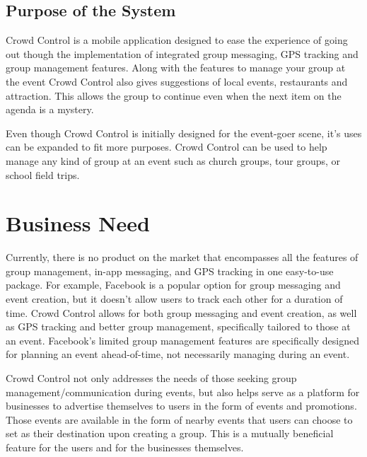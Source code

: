 \subsection{Purpose of the System}
Crowd Control is a mobile application designed to ease the experience of going out though the implementation of integrated group messaging, GPS tracking and group management features. Along with the features to manage your group at the event Crowd Control also gives suggestions of local events, restaurants and attraction. This allows the group to continue even when the next item on the agenda is a mystery. 

Even though Crowd Control is initially designed for the event-goer scene, it's uses can be expanded to fit more purposes. Crowd Control can be used to help manage any kind of group at an event such as church groups, tour groups, or school field trips.

\section{Business Need}

Currently, there is no product on the market that encompasses all the features of group management, in-app messaging, and GPS tracking in one easy-to-use package. For example, Facebook is a popular option for group messaging and event creation, but it doesn't allow users to track each other for a duration of time. Crowd Control allows for both group messaging and event creation, as well as GPS tracking and better group management, specifically tailored to those at an event. Facebook's limited group management features are specifically designed for planning an event ahead-of-time, not necessarily managing during an event.

Crowd Control not only addresses the needs of those seeking group management/communication during events, but also helps serve as a platform for businesses to advertise themselves to users in the form of events and promotions. Those events are available in the form of nearby events that users can choose to set as their destination upon creating a group. This is a mutually beneficial feature for the users and for the businesses themselves.


